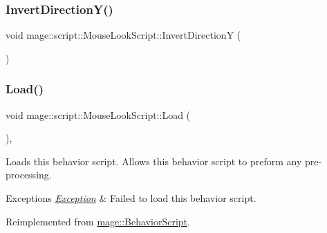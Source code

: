 \hypertarget{classmage_1_1script_1_1_mouse_look_script_a189145ae96f56b805fe2020ed75db0bc}{}\label{classmage_1_1script_1_1_mouse_look_script_a189145ae96f56b805fe2020ed75db0bc} 
\subsubsection{\texorpdfstring{Invert\+Direction\+Y()}{InvertDirectionY()}}
{\footnotesize\ttfamily void mage\+::script\+::\+Mouse\+Look\+Script\+::\+Invert\+DirectionY (\begin{DoxyParamCaption}{ }\end{DoxyParamCaption})\hspace{0.3cm}{\ttfamily [noexcept]}}

\hypertarget{classmage_1_1script_1_1_mouse_look_script_a4b26f1ac71e89eaac7903101b95745e9}{}\label{classmage_1_1script_1_1_mouse_look_script_a4b26f1ac71e89eaac7903101b95745e9} 
\subsubsection{\texorpdfstring{Load()}{Load()}}
{\footnotesize\ttfamily void mage\+::script\+::\+Mouse\+Look\+Script\+::\+Load (\begin{DoxyParamCaption}{ }\end{DoxyParamCaption})\hspace{0.3cm}{\ttfamily [override]}, {\ttfamily [virtual]}}

Loads this behavior script. Allows this behavior script to preform any pre-\/processing.


\begin{DoxyExceptions}{Exceptions}
{\em \hyperlink{classmage_1_1_exception}{Exception}} & Failed to load this behavior script. \\
\hline
\end{DoxyExceptions}


Reimplemented from \hyperlink{classmage_1_1_behavior_script_a06521eef472f2d878a9f652b95b723a8}{mage\+::\+Behavior\+Script}.

\hypertarget{classmage_1_1script_1_1_mouse_look_script_af7da565d15422579ab5ff34f8f6bbc6a}{}\label{classmage_1_1script_1_1_mouse_look_script_af7da565d15422579ab5ff34f8f6bbc6a} 

